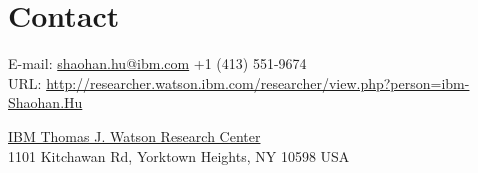 
\section{\sc Contact}
\vspace{.01in}
{E-mail:} {\href{mailto:shaohan.hu@ibm.com}{shaohan.hu@ibm.com}}\hspace{2in}{Phone:}  +1 (413) 551-9674\\
{URL:} {\url{http://researcher.watson.ibm.com/researcher/view.php?person=ibm-Shaohan.Hu}}

{\href{http://www.research.ibm.com/labs/watson/}{IBM Thomas J. Watson Research Center}} \\
{1101 Kitchawan Rd, Yorktown Heights, NY 10598 USA} \\
